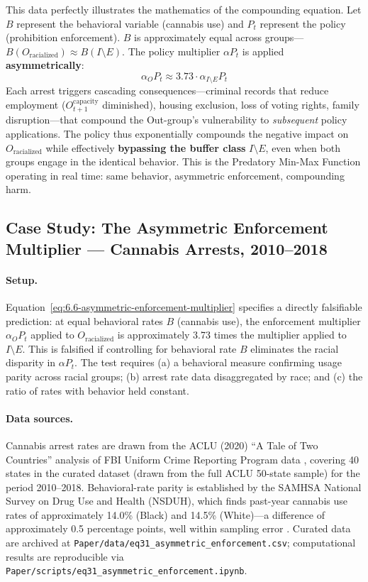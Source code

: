 This data perfectly illustrates the mathematics of the compounding equation. Let $B$ represent the behavioral variable (cannabis use) and $P_t$ represent the policy (prohibition enforcement). $B$ is approximately equal across groups---$B(O_{\text{racialized}}) \approx B(I \setminus E)$. The policy multiplier $\alpha P_t$ is applied \textbf{asymmetrically}:
\begin{equation}\label{eq:6.6-asymmetric-enforcement-multiplier}
\alpha_{O} P_t \approx 3.73 \cdot \alpha_{I \setminus E} P_t
\end{equation}
Each arrest triggers cascading consequences---criminal records that reduce employment ($O_{t+1}^{\text{capacity}}$ diminished), housing exclusion, loss of voting rights, family disruption---that compound the Out-group's vulnerability to \textit{subsequent} policy applications. The policy thus exponentially compounds the negative impact on $O_{\text{racialized}}$ while effectively \textbf{bypassing the buffer class} $I \setminus E$, even when both groups engage in the identical behavior. This is the Predatory Min-Max Function operating in real time: same behavior, asymmetric enforcement, compounding harm.

\subsection*{Case Study: The Asymmetric Enforcement Multiplier --- Cannabis Arrests, 2010--2018}
\label{cs:asymmetric_enforcement}

\paragraph{Setup.}
Equation~\ref{eq:6.6-asymmetric-enforcement-multiplier} specifies a directly falsifiable prediction: at equal behavioral rates $B$ (cannabis use), the enforcement multiplier $\alpha_O P_t$ applied to $O_{\text{racialized}}$ is approximately 3.73 times the multiplier applied to $I \setminus E$. This is falsified if controlling for behavioral rate $B$ eliminates the racial disparity in $\alpha P_t$. The test requires (a) a behavioral measure confirming usage parity across racial groups; (b) arrest rate data disaggregated by race; and (c) the ratio of rates with behavior held constant.

\paragraph{Data sources.}
Cannabis arrest rates are drawn from the ACLU (2020) ``A Tale of Two Countries'' analysis of FBI Uniform Crime Reporting Program data \cite{aclu2020}, covering 40 states in the curated dataset (drawn from the full ACLU 50-state sample) for the period 2010--2018. Behavioral-rate parity is established by the SAMHSA National Survey on Drug Use and Health (NSDUH), which finds past-year cannabis use rates of approximately 14.0\% (Black) and 14.5\% (White)---a difference of approximately 0.5 percentage points, well within sampling error \cite{samhsa_nsduh}. Curated data are archived at \texttt{Paper/data/eq31\_asymmetric\_enforcement.csv}; computational results are reproducible via \texttt{Paper/scripts/eq31\_asymmetric\_enforcement.ipynb}.

